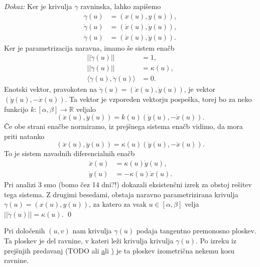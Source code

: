 {\em Dokaz:\/}
 Ker je krivulja $\gamma$ ravninska, lahko zapišemo 
 \begin{align*}
     \gamma(u) &= (x(u), y(u)), \\
     \dot{\gamma}(u) &= (\dot{x}(u), \dot{y}(u)), \\ 
     \ddot{\gamma}(u) &= (\ddot{x}(u), \ddot{y}(u)).
 \end{align*}
 Ker je parametrizacija naravna, imamo še sistem enačb
 \begin{align*}
  \lvert\lvert \dot{\gamma}(u) \rvert\rvert &= 1,   \\
  \lvert\lvert \ddot{\gamma}(u) \rvert\rvert &= \kappa(u) ,   \\
    \langle \ddot{\gamma}(u), \dot{\gamma}(u) \rangle   &= 0.
 \end{align*}
 Enotski vektor, pravokoten na $\dot{\gamma}(u) = (\dot{x}(u), \dot{y}(u))$, je vektor $(\dot{y}(u), -\dot{x}(u))$. Ta vektor je vzporeden vektorju pospeška,
 torej bo za neko funkcijo $k : [\alpha, \beta]  \to \mathbb{R}$ veljalo 
 \begin{equation*} (\ddot{x}(u), \ddot{y}(u)) = k(u) (\dot{y}(u), -\dot{x}(u)). \end{equation*}Če obe strani enačbe normiramo, iz prejšnega sistema enačb vidimo, da mora priti natanko 
 \begin{equation*} (\ddot{x}(u), \ddot{y}(u)) = \kappa(u) (\dot{y}(u), -\dot{x}(u)).\end{equation*}To je sistem navadnih diferencialnih enačb 
 \begin{align*}
     \ddot{x}(u) &= \kappa(u) \dot{y}(u), \\
     \ddot{y}(u) &= -\kappa(u) \dot{x}(u).
 \end{align*}
Pri analizi 3 smo (bomo čez 14 dni?!) dokazali eksistenčni izrek za obstoj rešitev tega sistema. Z drugimi besedami, obstaja
naravno parametrizirana krivulja $\gamma(u) = (x(u), y(u))$, za katero za vsak $u \in [\alpha, \beta]$ velja $\lvert\lvert \ddot{\gamma}(u) \rvert\rvert = \kappa(u)$.
\qed

\begin{opomba}
 Pri določenih $(u,v)$ nam krivulja $\gamma(u)$ podaja tangentno premonosno ploskev. Ta ploskev je del ravnine, v kateri
 leži krivulja krivulja $\gamma(u)$. Po izreku iz prejšnjih predavanj (TODO ali \href{izr_izometricnost_in_prva_forma} ali \href{izr_izometricnost_ploskev_ravnini}) je ta ploskev izometrična nekemu kosu ravnine.
\end{opomba}

